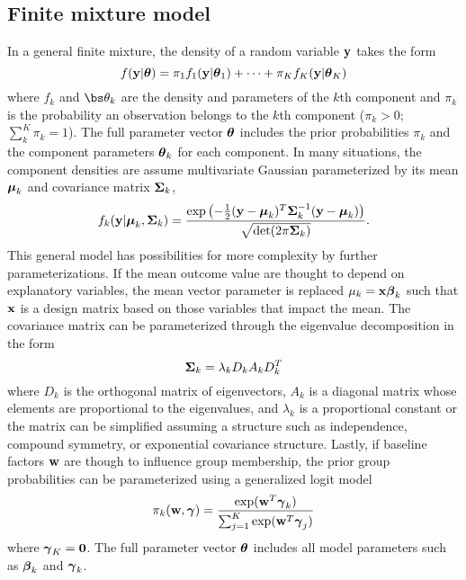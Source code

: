 \subsection{Finite mixture model}
In a general finite mixture, the density of a random variable $\mathbf y$ takes the form
$$f(\mathbf y|\boldsymbol\theta)=\pi_{1}f_{1}(\mathbf y|\boldsymbol\theta_1)+\cdots+\pi_{K}f_{K}(\mathbf y|\boldsymbol\theta_K)$$
where $f_k$ and $\bs\theta_k$ are the density and parameters of the $k$th component and $\pi_{k}$ is the probability an observation belongs to the $k$th component ($\pi_{k}>0$; $\sum^{K}_{k}\pi_{k}=1$). The full parameter vector $\boldsymbol\theta$ includes the prior probabilities $\pi_k$ and the component parameters $\boldsymbol\theta_k$ for each component. In many situations, the component densities are assume multivariate Gaussian parameterized by its mean $\boldsymbol\mu_{k}$ and covariance matrix $\boldsymbol\Sigma_{k}$,
$$f_k(\mathbf y| \boldsymbol\mu_k,\boldsymbol\Sigma_k) = \frac{\exp\left(-\frac{1}{2}(\mathbf y - \boldsymbol\mu_k)^T\boldsymbol\Sigma_k^{-1}(\mathbf y-\boldsymbol\mu_k)\right)}{\sqrt{\det(2\pi \boldsymbol\Sigma_k)}}.$$
This general model has possibilities for more complexity by further parameterizations. If the mean outcome value are thought to depend on explanatory variables, the mean vector parameter is replaced $\mu_k = \mathbf x \boldsymbol \beta_k$ such that $\mathbf x$ is a design matrix based on those variables that impact the mean. The covariance matrix can be parameterized through the eigenvalue decomposition in the form
$$\boldsymbol\Sigma_k=\lambda_k D_kA_kD_k^T$$
where $D_k$ is the orthogonal matrix of eigenvectors, $A_k$ is a diagonal matrix whose elements are proportional to the eigenvalues, and $\lambda_k$ is a proportional constant \cite{banfield1993} or the matrix can be simplified assuming a structure such as independence, compound symmetry, or exponential covariance structure. Lastly, if baseline factors $\mathbf w$ are though to influence group membership, the prior group probabilities can be parameterized using a generalized logit model
$$\pi_k(\mathbf w,\boldsymbol\gamma)= \frac{\exp(\mathbf w^T \boldsymbol \gamma_k) }{\sum_{j=1}^K \exp(\mathbf w^T \boldsymbol \gamma_j)}$$
where $\boldsymbol\gamma_{K}=\mathbf 0$. The full parameter vector $\boldsymbol\theta$ includes all model parameters such as $\boldsymbol\beta_k$ and $\boldsymbol\gamma_k$.

